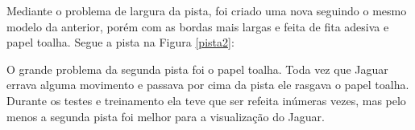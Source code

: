	\begin{figure}[H]
		\centering
\end{figure}


Mediante o problema de largura da pista, foi criado uma nova seguindo o mesmo modelo da anterior, porém com as bordas mais largas e feita de fita adesiva e papel toalha. Segue a pista na Figura \ref{pista2}:

	\begin{figure}[H]
		\centering
\end{figure}


O grande problema da segunda pista foi o papel toalha. Toda vez que Jaguar errava alguma movimento e passava por cima da pista ele rasgava o papel toalha. Durante os testes e treinamento ela teve que ser refeita inúmeras vezes, mas pelo menos a segunda pista foi melhor para a visualização do Jaguar. 


